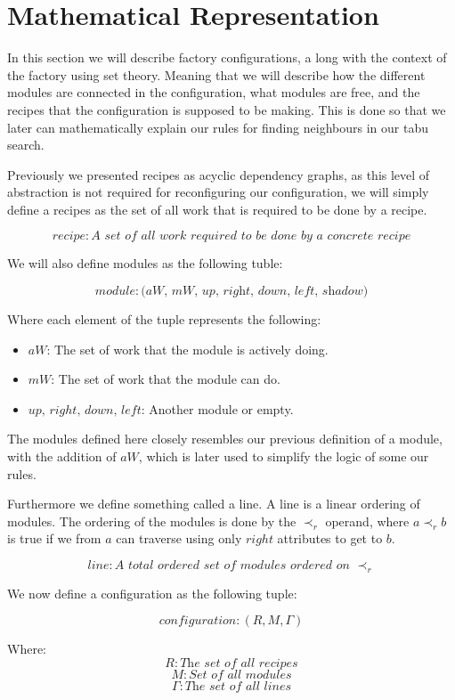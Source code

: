 \section{Mathematical Representation}

In this section we will describe factory configurations, a long with the context of the factory using set theory. Meaning that we will describe how the different modules are connected in the configuration, what modules are free, and the recipes that the configuration is supposed to be making. This is done so that we later can mathematically explain our rules for finding neighbours in our tabu search.

Previously we presented recipes as acyclic dependency graphs, as this level of abstraction is not required for reconfiguring our configuration, we will simply define a recipes as the set of all work that is required to be done by a recipe.

\[recipe: \textit{A set of all work required to be done by a concrete recipe}\]

\noindent We will also define modules as the following tuble:

\[module: \textit{(aW, mW, up, right, down, left, shadow)}\]

\noindent Where each element of the tuple represents the following:
\begin{itemize}
\item $aW$: The set of work that the module is actively doing.
\item $mW$: The set of work that the module can do.
\item $up,\, right,\, down,\, left$: Another module or empty.
\end{itemize}

The modules defined here closely resembles our previous definition of a module, with the addition of $aW$, which is later used to simplify the logic of some our rules.

Furthermore we define something called a line. A line is a linear ordering of modules. The ordering of the modules is done by the $\prec_r$ operand, where $a \prec_r b$ is true if we from $a$ can traverse using only $right$ attributes to get to $b$.

\[line: \textit{A total ordered set of modules ordered on } \prec_r\]

We now define a configuration as the following tuple:

\[configuration: (R, M, \Gamma)\]

Where:
\[R: \textit{The set of all recipes}\]
\[M: \textit{Set of all modules}\]
\[\Gamma: \textit{The set of all lines}\]



